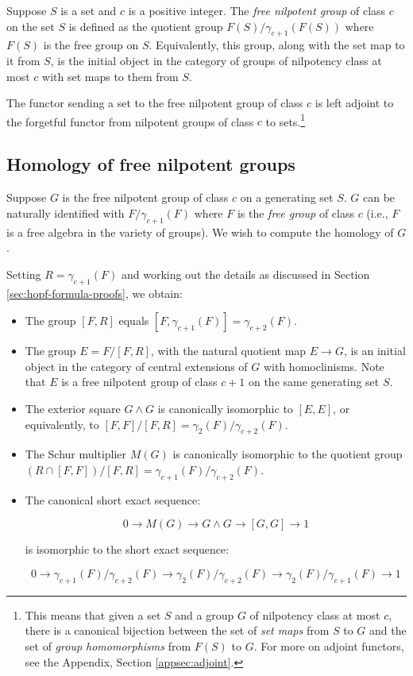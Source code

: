\begin{definer}
  Suppose $S$ is a set and $c$ is a positive integer. The {\em free
    nilpotent group} of class $c$ on the set $S$ is defined as the
  quotient group $F(S)/\gamma_{c+1}(F(S))$ where $F(S)$ is the free
  group on $S$. Equivalently, this group, along with the set map to it
  from $S$, is the initial object in the category of groups of
  nilpotency class at most $c$ with set maps to them from $S$.

  The functor sending a set to the free nilpotent group of class $c$
  is left adjoint to the forgetful functor from nilpotent groups of
  class $c$ to sets.\footnote{This means that given a set $S$ and a
    group $G$ of nilpotency class at most $c$, there is a canonical
    bijection between the set of {\em set maps} from $S$ to $G$ and
    the set of {\em group homomorphisms} from $F(S)$ to $G$. For more
    on adjoint functors, see the Appendix, Section
    \ref{appsec:adjoint}.}
\end{definer}

\subsection{Homology of free nilpotent groups}

Suppose $G$ is the free nilpotent group of class $c$ on a generating
set $S$. $G$ can be naturally identified with $F/\gamma_{c+1}(F)$
where $F$ is the {\em free group} of class $c$ (i.e., $F$ is a free
algebra in the variety of groups). We wish to compute the homology of
$G$.

Setting $R = \gamma_{c+1}(F)$ and working out the details as discussed
in Section \ref{sec:hopf-formula-proofs}, we obtain:

\begin{itemize}
\item The group $[F,R]$ equals $[F,\gamma_{c+1}(F)] = \gamma_{c+2}(F)$.
\item The group $E = F/[F,R]$, with the natural quotient map $E \to
  G$, is an initial object in the category of central extensions of
  $G$ with homoclinisms. Note that $E$ is a free nilpotent group of
  class $c + 1$ on the same generating set $S$.
\item The exterior square $G \wedge G$ is canonically isomorphic to
  $[E,E]$, or equivalently, to $[F,F]/[F,R] =
  \gamma_2(F)/\gamma_{c+2}(F)$.
\item The Schur multiplier $M(G)$ is canonically isomorphic to the
  quotient group $(R \cap [F,F])/[F,R] =
  \gamma_{c+1}(F)/\gamma_{c+2}(F)$.
\item The canonical short exact sequence:

  $$0 \to M(G) \to G \wedge G \to [G,G] \to 1$$

  is isomorphic to the short exact sequence:
  
  $$0 \to \gamma_{c+1}(F)/\gamma_{c+2}(F) \to \gamma_2(F)/\gamma_{c+2}(F) \to \gamma_2(F)/\gamma_{c+1}(F) \to 1$$
\end{itemize}

